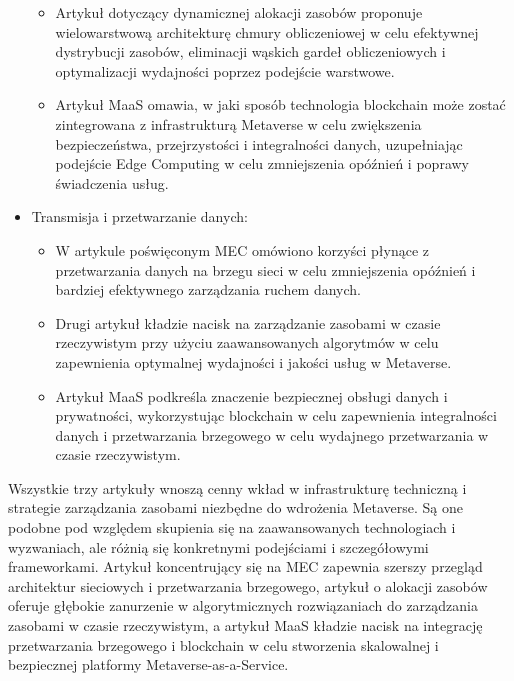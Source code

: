 \begin{itemize}
\begin{itemize}
        \item Artykuł dotyczący dynamicznej alokacji zasobów proponuje wielowarstwową architekturę chmury obliczeniowej w celu efektywnej dystrybucji zasobów, eliminacji wąskich gardeł obliczeniowych i optymalizacji wydajności poprzez podejście warstwowe.
        \item Artykuł MaaS omawia, w jaki sposób technologia blockchain może zostać zintegrowana z infrastrukturą Metaverse w celu zwiększenia bezpieczeństwa, przejrzystości i integralności danych, uzupełniając podejście Edge Computing w celu zmniejszenia opóźnień i poprawy świadczenia usług.
    \end{itemize}
    \item Transmisja i przetwarzanie danych:
    \begin{itemize}
        \item W artykule poświęconym MEC omówiono korzyści płynące z przetwarzania danych na brzegu sieci w celu zmniejszenia opóźnień i bardziej efektywnego zarządzania ruchem danych.
        \item Drugi artykuł kładzie nacisk na zarządzanie zasobami w czasie rzeczywistym przy użyciu zaawansowanych algorytmów w celu zapewnienia optymalnej wydajności i jakości usług w Metaverse.
        \item Artykuł MaaS podkreśla znaczenie bezpiecznej obsługi danych i prywatności, wykorzystując blockchain w celu zapewnienia integralności danych i przetwarzania brzegowego w celu wydajnego przetwarzania w czasie rzeczywistym.
    \end{itemize}
\end{itemize}

Wszystkie trzy artykuły wnoszą cenny wkład w infrastrukturę techniczną i strategie zarządzania zasobami niezbędne do wdrożenia Metaverse. Są one podobne pod względem skupienia się na zaawansowanych technologiach i wyzwaniach, ale różnią się konkretnymi podejściami i szczegółowymi frameworkami. Artykuł koncentrujący się na MEC zapewnia szerszy przegląd architektur sieciowych i przetwarzania brzegowego, artykuł o alokacji zasobów oferuje głębokie zanurzenie w algorytmicznych rozwiązaniach do zarządzania zasobami w czasie rzeczywistym, a artykuł MaaS kładzie nacisk na integrację przetwarzania brzegowego i blockchain w celu stworzenia skalowalnej i bezpiecznej platformy Metaverse-as-a-Service.